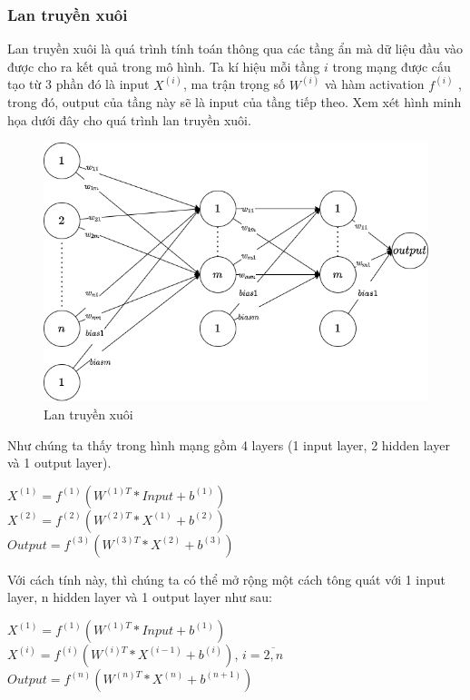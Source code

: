 \subsubsection{Lan truyền xuôi }
Lan truyền xuôi là quá trình tính toán thông qua các tầng ẩn mà dữ liệu đầu vào được cho ra kết quả trong mô hình. Ta kí hiệu mỗi tầng $i$ trong mạng được cấu tạo từ 3 phần đó là input $X^{(i)}$, ma trận trọng số $W^{(i)}$ và hàm activation $f^{(i)}$ , trong đó, output của tầng này sẽ là input của tầng tiếp theo. Xem xét hình minh họa dưới đây cho quá trình lan truyền xuôi.
\clearpage
\begin{figure}[!h]
	\centering
		\includegraphics[width=0.75\columnwidth]{books/artificial-neural-network/chapter03/figure/ltx.png}
        \caption{Lan truyền xuôi}
        \label{fig:ltx}
		\centering
\end{figure}

Như chúng ta thấy trong hình mạng gồm 4 layers (1 input layer, 2 hidden layer và 1 output layer).
\begin{center}
    $X^{(1)} = f^{(1)}(W^{(1)T}*Input+b^{(1)})$\\
    $X^{(2)} = f^{(2)}(W^{(2)T}*X^{(1)}+b^{(2)})$\\
    $Output = f^{(3)}(W^{(3)T}*X^{(2)}+b^{(3)})$\\
\end{center}

Với cách tính này, thì chúng ta có thể mở rộng một cách tông quát với 1 input layer, n hidden layer và 1 output layer như sau:
\begin{center}
    $X^{(1)} = f^{(1)}(W^{(1)T}*Input+b^{(1)})$\\
    $X^{(i)} = f^{(i)}(W^{(i)T}*X^{(i-1)}+b^{(i)})$, $i=\overline{2,n}$\\
    $Output = f^{(n)}(W^{(n)T}*X^{(n)}+b^{(n+1)})$\\
\end{center}

